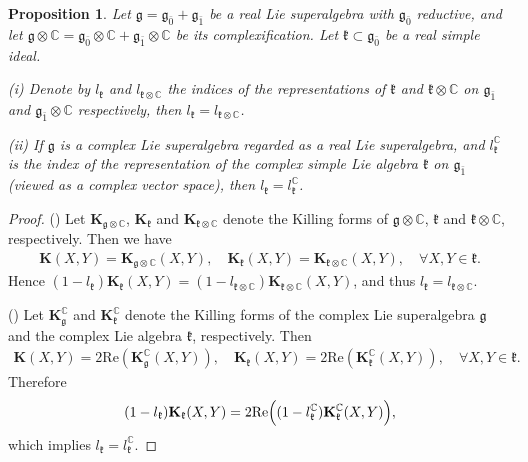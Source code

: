 \documentclass[reqno]{amsart}
\newtheorem{prop}[thm]{Proposition}
\theoremstyle{definition}
\begin{document}
\begin{prop}\label{2-prop-index}
Let $\mathfrak{g}=\mathfrak{g}_{\bar{0}}+\mathfrak{g}_{\bar{1}}$ be a real Lie superalgebra with $\mathfrak{g}_{\bar{0}}$ reductive, and let $\mathfrak{g}\otimes\mathbb{C}=\mathfrak{g}_{\bar{0}}\otimes\mathbb{C}+\mathfrak{g}_{\bar{1}}\otimes\mathbb{C}$ be its complexification.  Let $\mathfrak{k}\subset \mathfrak{g}_{\bar{0}}$ be a real simple ideal.

(i) Denote by $l_{\mathfrak{k}}$ and $l_{\mathfrak{k}\otimes\mathbb{C}}$  the indices of the representations of $\mathfrak{k}$ and $\mathfrak{k}\otimes\mathbb{C}$ on $\mathfrak{g}_{\bar{1}}$ and $\mathfrak{g}_{\bar{1}}\otimes\mathbb{C}$ respectively, then $l_{\mathfrak{k}}=l_{\mathfrak{k}\otimes\mathbb{C}}$.

(ii) If $\mathfrak{g}$ is a complex Lie superalgebra regarded as a real Lie superalgebra, and $l_{\mathfrak{k}}^{\mathbb{C}}$ is the index of the representation of the complex simple Lie algebra $\mathfrak{k}$ on $\mathfrak{g}_{\bar{1}}$ (viewed as a complex vector space), then $l_{\mathfrak{k}}=l_{\mathfrak{k}}^{\mathbb{C}}$.
\end{prop}

\begin{proof}
() Let $\mathbf{K}_{\mathfrak{g}\otimes\mathbb{C}}$, $\mathbf{K}_{\mathfrak{k}}$ and $\mathbf{K}_{\mathfrak{k}\otimes\mathbb{C}}$ denote the Killing forms of $\mathfrak{g}\otimes\mathbb{C}$, $\mathfrak{k}$ and $\mathfrak{k}\otimes\mathbb{C}$, respectively. Then we have
\begin{eqnarray*}
\mathbf{K}(X,Y)=\mathbf{K}_{\mathfrak{g}\otimes\mathbb{C}}(X,Y), \quad  \mathbf{K}_{\mathfrak{k}}(X,Y)=\mathbf{K}_{\mathfrak{k}\otimes\mathbb{C}}(X,Y), \quad \forall X,Y\in \mathfrak{k}.
\end{eqnarray*}
Hence $(1-l_{\mathfrak{k}})\mathbf{K}_{\mathfrak{k}}(X,Y)
=(1-l_{\mathfrak{k}\otimes\mathbb{C}})\mathbf{K}_{\mathfrak{k}\otimes\mathbb{C}}(X,Y)$, and thus $l_{\mathfrak{k}}=l_{\mathfrak{k}\otimes\mathbb{C}}$.

() Let $\mathbf{K}_{\mathfrak{g}}^{\mathbb{C}}$ and $\mathbf{K}_{\mathfrak{k}}^{\mathbb{C}}$ denote the Killing forms of the  complex Lie superalgebra $\mathfrak{g}$ and the complex Lie algebra $\mathfrak{k}$, respectively. Then
\begin{eqnarray*}
\mathbf{K}(X,Y)=2\mathrm{Re}(\mathbf{K}_{\mathfrak{g}}^{\mathbb{C}}(X,Y)),\quad
\mathbf{K}_{\mathfrak{k}}(X,Y)=2\mathrm{Re}(\mathbf{K}_{\mathfrak{k}}^{\mathbb{C}}(X,Y)),
\quad \forall X,Y\in\mathfrak{k}.
\end{eqnarray*}
Therefore
\begin{eqnarray*}
(1-l_{\mathfrak{k}})\mathbf{K}_{\mathfrak{k}}(X,Y)=2\mathrm{Re}\Big{(}(1-l_{\mathfrak{k}}^{\mathbb{C}})\mathbf{K}_{\mathfrak{k}}^{\mathbb{C}}(X,Y)\Big{)},
\end{eqnarray*}
which implies $l_{\mathfrak{k}}=l_{\mathfrak{k}}^{\mathbb{C}}$.
\end{proof}
\end{document}
